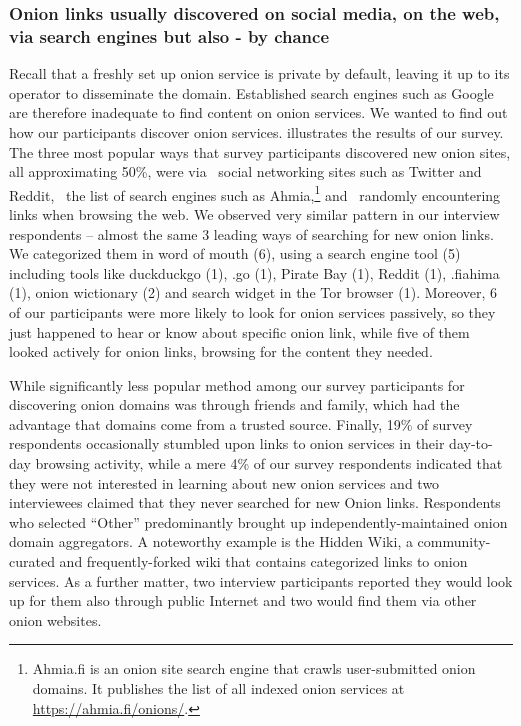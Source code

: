 \subsubsection{Onion links usually discovered on social media, on the web, via search engines but also - by chance}
Recall that a freshly set up onion service is private by default, leaving it up
to its operator to disseminate the domain.  Established search engines such as
Google are therefore inadequate to find content on onion services.  We wanted to
find out how our participants discover onion services.
 illustrates the results of our survey.  The three most popular ways
that survey participants discovered new onion sites, all approximating 50\%, were via \first~social
networking sites such as Twitter and Reddit, \second~the list of search engines
such as Ahmia,\footnote{Ahmia.fi is an onion site search engine that crawls
user-submitted onion domains.  It publishes the list of all indexed onion
services at \url{https://ahmia.fi/onions/}.} and \third~randomly encountering
links when browsing the web. 
We observed very similar pattern in our interview respondents – almost the same 3 leading ways of searching for new onion links.  We categorized them in word of mouth (6), using a search engine tool (5) including tools like duckduckgo (1), .go (1), Pirate Bay (1), Reddit (1), .fiahima (1), onion wictionary (2) and search widget in the Tor browser (1). Moreover, 6 of our participants were more likely to look for onion services passively, so they just happened to hear or know about specific onion link, while five of them looked actively for onion links, browsing for the content they needed.

While significantly less popular method among our survey participants for discovering onion domains was through friends and
family, which had the advantage that domains come from a trusted source. 
Finally, 19\% of survey respondents occasionally
stumbled upon links to onion services in their day-to-day browsing activity, while
a mere
4\% of our survey respondents indicated that they were not interested in learning about new onion services and two interviewees claimed that they never searched for new Onion links.
Respondents who selected ``Other'' predominantly brought up
independently-maintained onion domain aggregators.  A noteworthy example is the
Hidden Wiki, a community-curated and frequently-forked wiki that contains
categorized links to onion services.  As a further matter, two interview participants reported they would look up for them also through public Internet and two would find them via other onion websites.

